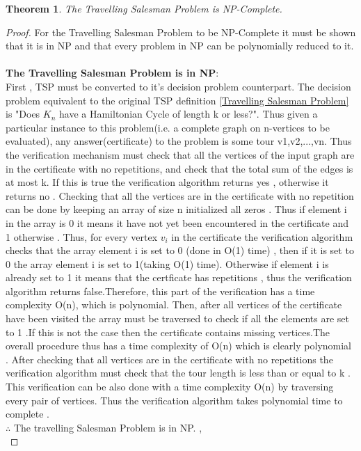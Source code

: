 \documentclass{article}
\newtheorem{theorem}{Theorem}[subsection]
\begin{document}
\begin{theorem}
\label{TSP is NPC}
The Travelling Salesman Problem is NP-Complete.
\end{theorem}
\begin{proof}
For the Travelling Salesman Problem to be NP-Complete it must be shown that it is in NP and that every problem in NP can be polynomially reduced to it.\\
\\
\textbf{The Travelling Salesman Problem is in NP}:\\
First , TSP must be converted to it's decision problem counterpart. The decision problem equivalent to the original TSP definition \ref{Travelling Salesman Problem} is "Does $K_n$ have a Hamiltonian Cycle of length k or less?". Thus given a particular instance to this problem(i.e. a complete graph on n-vertices to be evaluated), any answer(certificate) to the problem is some tour v1,v2,...,vn. Thus the verification mechanism must check that all the vertices of the input graph are in the certificate with no repetitions, and check that the total sum of the edges is at most k. If this is true the verification algorithm returns yes , otherwise it returns no . Checking that all the vertices are in the certificate with no repetition can be done by keeping an array of size n initialized all zeros . Thus if element i in the array is 0 it means it have not yet been encountered in the certificate and 1 otherwise . Thus, for every vertex $v_i$ in the certificate the verification algorithm checks that the array element i is set to 0 (done in O(1) time) , then if it is set to 0 the array element i is set to 1(taking O(1) time). Otherwise if element i is already set to 1 it means that the certficate has repetitions , thus the verification algorithm returns false.Therefore, this part of the verification has a time complexity O(n), which is polynomial. Then, after all vertices of the certificate have been visited the array must be traversed to check if all the elements are set to 1 .If this is not the case then the certificate contains missing vertices.The overall procedure thus has a time complexity of O(n) which is clearly polynomial . After checking that all vertices are in the certificate with no repetitions the verification algorithm must check that the tour length is less than or equal to k . This verification can be also done with a time complexity O(n) by traversing every pair of vertices. Thus the verification algorithm takes polynomial time to complete .\\
$\therefore$ The travelling Salesman Problem is in NP. \cite{cormen_leiserson_rivest_stein}, \cite{rowell}\\

\end{proof}
\end{document}
